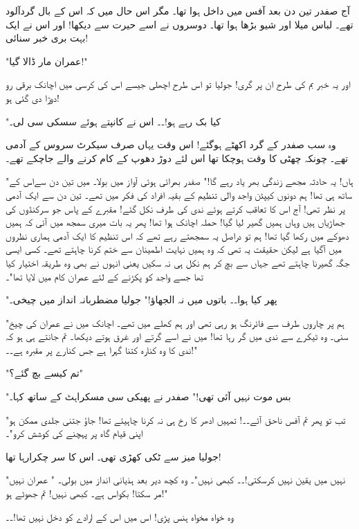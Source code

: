 \endR

\bigskip\bigskip\bigskip
\centerline{}
\bigskip\bigskip\bigskip
\beginR
\body


آج صفدر تین دن بعد آفس میں داخل ہوا تھا۔ مگر اس حال میں کہ اس کے بال گردآلود تھے۔ لباس میلا اور شیو بڑھا ہوا تھا۔
دوسروں نے اسے حیرت سے دیکھا! اور اس نے ایک بہت بری خبر سنائی!

"عمران مار ڈالا گیا!"

اور یہ خبر بم کی طرح ان پر گری! جولیا تو اس طرح اچھلی جیسے اس کی کرسی میں اچانک برقی رو دوڑا دی گئی ہو!

"کیا بک رہے ہو!۔۔ اس نے کانپتے ہوئے سسکی سی لی۔

وہ سب صفدر کے گرد اکھٹے ہوگئے! اس وقت یہاں صرف سیکرٹ سروس کے آدمی تھے۔ چونکہ چھٹی کا وقت ہوچکا تھا اس لئے دوڑ دھوپ کے کام کرنے والے جاچکے تھے۔

"ہاں! یہ حادثہ مجھے زندگی بھر یاد رہے گا!" صفدر بھرائی ہوئی آواز میں بولا۔ میں تین دن سےاس کے ساتھ ہی تھا! ہم دونوں کیپٹن واجد والی تنظیم کے بقیہ افراد کی فکر میں تھے۔ تین دن سے ایک آدمی پر نظر تھی! آج اس کا تعاقب کرتے ہوئے ندی کی طرف نکل گئے! مقبرے کے پاس جو سرکنڈوں کی جھاڑیاں ہیں وہاں ہمیں گھیر لیا گیا! حملہ اچانک ہوا تھا! پھر یہ بات میری سمجھ میں آئی کہ ہمیں دھوکے میں رکھا گیا تھا! ہم تو دراصل یہ سمجھتے رہے تھے کہ اس تنظیم کا ایک آدمی ہماری نظروں میں آگیا ہے لیکن حقیقت یہ تھی کہ وہ ہمیں نہایت اطمینان سے ختم کرنا چاہتے تھے۔ کسی ایسی جگہ گھیرنا چاہتے تھے جہاں سے بچ کر ہم نکل ہی نہ سکیں یعنی انہوں نے بھی وہ طریقہ اختیار کیا تھا جسے واجد کو پکڑنے کے لئے عمران کام میں لایا تھا"۔

"پھر کیا ہوا۔۔ باتوں میں نہ الجھاؤ!" جولیا مضطربانہ انداز میں چیخی۔

"ہم پر چاروں طرف سے فائرنگ ہو رہی تھی اور ہم کھلے میں تھے۔ اچانک میں نے عمران کی چیخ سنی۔ وہ ٹیکرے سے ندی میں گر رہا تھا! میں نے اسے گرتے اور غرق ہوتے دیکھا۔ تم جانتے ہی ہو کہ ندی کا وہ کنارہ کتنا گہرا ہے جس کنارے پر مقبرہ ہے۔۔!"

"تم کیسے بچ گئے؟"

"بس موت نہیں آئی تھی!" صفدر نے پھیکی سی مسکراہٹ کے ساتھ کہا۔

"تب تو پھر تم آفس ناحق آئے۔۔! تمہیں ادھر کا رخ ہی نہ کرنا چاہیئے تھا! جاؤ جتنی جلدی ممکن ہو اپنی قیام گاہ پر پہچنے کی کوشش کرو"۔

جولیا میز سے ٹکی کھڑی تھی۔ اس کا سر چکرارہا تھا!

"نہیں میں یقین نہیں کرسکتی!۔۔ کبھی نہیں"۔ وہ کچھ دیر بعد ہذیانی انداز میں بولی۔ " عمران نہیں مر سکتا! بکواس ہے۔ کبھی نہیں! تم جھوٹے ہو!"

وہ خواہ مخواہ ہنس پڑی! اس میں اس کے ارادے کو دخل نہیں تھا!۔۔

